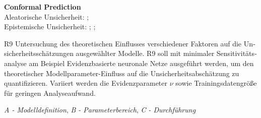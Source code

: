 \begin{otherlanguage}{ngerman}
{\begin{minipage}[t]{\textwidth}
\textbf{\gls{Conformal Prediction}}\\
Aleatorische Unsicherheit: \parencite[S.~4–5]{vovk2005algorithmic}; \parencite{angelopoulos2021gentle} \\
Epistemische Unsicherheit: \parencite{angelopoulos2021gentle}; \parencite[S.~63–65]{shafer2008tutorial}; \parencite{rasmussen2006gaussian}
\end{minipage}%
}


\pagebreak


R9 Untersuchung des theoretischen Einflusses verschiedener Faktoren auf die Unsicherheitsschätzungen ausgewählter Modelle.
\newline
R9 soll mit minimaler Sensitivitätsanalyse am Beispiel \gls{Evidenzbasierte neuronale Netze} ausgeführt werden, um den theoretischer Modellparameter-Einfluss auf die Unsicherheitsabschätzung zu quantifizieren. Variiert werden die Evidenzparameter $\nu$ sowie Trainingsdatengröße für geringen Analyseaufwand.



\textit{A - Modelldefinition}, \textit{B - Parameterbereich}, \textit{C - Durchführung}


\end{otherlanguage}
